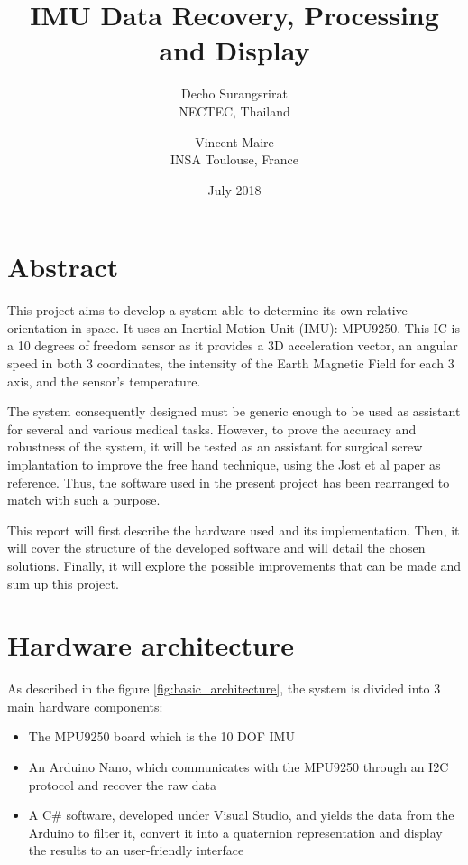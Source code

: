 \documentclass{article}
\title{IMU Data Recovery, Processing and Display}
\author{ Decho Surangsrirat \\
         NECTEC, Thailand 
         \and 
         Vincent Maire\\
         INSA Toulouse, France }
\date{July 2018}
\begin{document}
\maketitle


\section{Abstract}

This project aims to develop a system able to determine its own relative orientation in space. It uses an Inertial Motion Unit (IMU): MPU9250. This IC is a 10 degrees of freedom sensor as it provides a 3D acceleration vector, an angular speed in both 3 coordinates, the intensity of the Earth Magnetic Field for each 3 axis, and the sensor's temperature. 

The system consequently designed must be generic enough to be used as assistant for several and various medical tasks. However, to prove the accuracy and robustness of the system, it will be tested as an assistant for surgical screw implantation to improve the free hand technique, using the Jost et al paper \cite{jost} as reference. Thus, the software used in the present project has been rearranged to match with such a purpose. 

This report will first describe the hardware used and its implementation. Then, it will cover the structure of the developed software and will detail the chosen solutions. Finally, it will explore the possible improvements that can be made and sum up this project.


\section{Hardware architecture}

As described in the figure \ref{fig:basic_architecture}, the system is divided into 3 main hardware components:
\begin{itemize}
    \item The MPU9250 board which is the 10 DOF IMU
    \item An Arduino Nano, which communicates with the MPU9250 through an I2C protocol and recover the raw data
    \item A C\# software, developed under Visual Studio, and yields the data from the Arduino to filter it, convert it into a quaternion representation and display the results to an user-friendly interface 
\end{itemize} 
\end{document}
